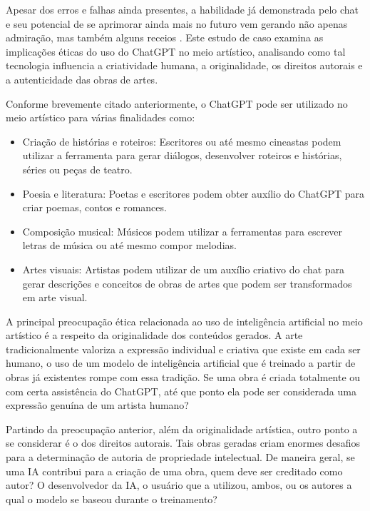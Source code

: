 Apesar dos erros e falhas ainda presentes, a habilidade já demonstrada pelo chat e seu potencial de se aprimorar ainda mais no futuro vem gerando não apenas admiração, mas também alguns receios \cite{suzuki2023}. Este estudo de caso examina as implicações éticas do uso do ChatGPT no meio artístico, analisando como tal tecnologia influencia a criatividade humana, a originalidade, os direitos autorais e a autenticidade das obras de artes.

Conforme brevemente citado anteriormente, o ChatGPT pode ser utilizado no meio artístico para várias finalidades como:

\begin{itemize}
    \item Criação de histórias e roteiros: Escritores ou até mesmo cineastas podem utilizar a ferramenta para gerar diálogos, desenvolver roteiros e histórias, séries ou peças de teatro.
    \item Poesia e literatura: Poetas e escritores podem obter auxílio do ChatGPT para criar poemas, contos e romances.
    \item Composição musical: Músicos podem utilizar a ferramentas para escrever letras de música ou até mesmo compor melodias.
    \item Artes visuais: Artistas podem utilizar de um auxílio criativo do chat para gerar descrições e conceitos de obras de artes que podem ser transformados em arte visual.
\end{itemize}

A principal preocupação ética relacionada ao uso de inteligência artificial no meio artístico é a respeito da originalidade dos conteúdos gerados. A arte tradicionalmente valoriza a expressão individual e criativa que existe em cada ser humano, o uso de um modelo de inteligência artificial que é treinado a partir de obras já existentes rompe com essa tradição. Se uma obra é criada totalmente ou com certa assistência do ChatGPT, até que ponto ela pode ser considerada uma expressão genuína de um artista humano?

Partindo da preocupação anterior, além da originalidade artística, outro ponto a se considerar é o dos direitos autorais. Tais obras geradas criam enormes desafios para a determinação de autoria de propriedade intelectual. De maneira geral, se uma IA contribui para a criação de uma obra, quem deve ser creditado como autor? O desenvolvedor da IA, o usuário que a utilizou, ambos, ou os autores a qual o modelo se baseou durante o treinamento?

